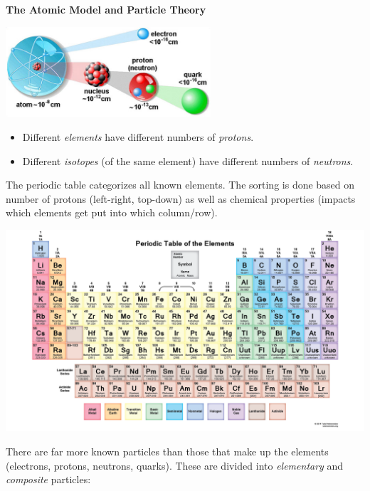 \documentclass[12pt]{article}
\begin{document}
\noindent\textbf{\large The Atomic Model and Particle Theory}
\begin{center}
\includegraphics[width=3in]{../images/atoms.jpeg}
\end{center}

\begin{itemize}
	\item Different \textit{elements} have different numbers of \textit{protons}.
	\item Different \textit{isotopes} (of the same element) have different numbers of \textit{neutrons}.
\end{itemize}

The periodic table categorizes all known elements. The sorting is done based on number of protons (left-right, top-down) as well as chemical properties (impacts which elements get put into which column/row).

\begin{center}
\noindent\includegraphics[width=\textwidth]{../images/periodicTable.png}
\end{center}

There are far more known particles than those that make up the elements (electrons, protons, neutrons, quarks). These are divided into \textit{elementary} and \textit{composite} particles:
\end{document}
